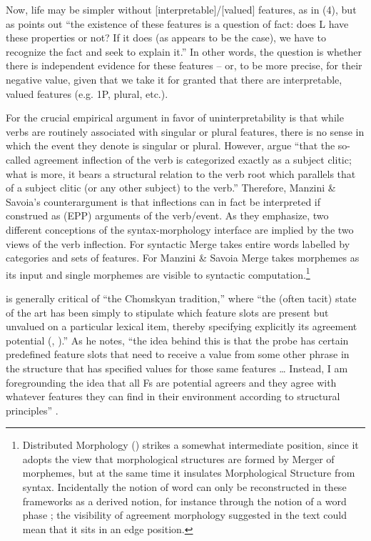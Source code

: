 \documentclass[output=paper]{langsci/langscibook}
\begin{document}
 Now, life may be simpler without [interpretable]/[valued] features, as in (4), but as \citet[4]{Chomsky2001Derivation} points out “the existence of these features is a question of fact: does L have these properties or not? If it does (as appears to be the case), we have to recognize the fact and seek to explain it.” In other words, the question is whether there is independent evidence for these features – or, to be more precise, for their negative value, given that we take it for granted that there are interpretable, valued features (e.g. 1P, plural, etc.).

For \citet{Chomsky1995} the crucial empirical argument in favor of uninterpretability is that while verbs are routinely associated with singular or plural features, there is no sense in which the event they denote is singular or plural. However, \citet[21]{Manzini2007} argue “that the so-called agreement inflection of the verb is categorized exactly as a subject clitic; what is more, it bears a structural relation to the verb root which parallels that of a subject clitic (or any other subject) to the verb.” Therefore, Manzini \& Savoia’s counterargument is that inflections can in fact be interpreted if construed as (EPP) arguments of the verb\slash event. As they emphasize, two different conceptions of the syntax-morphology interface are implied by the two views of the verb inflection. For \citet{Chomsky1995} syntactic Merge takes entire words labelled by categories and sets of features. For Manzini \& Savoia Merge takes morphemes as its input and single morphemes are visible to syntactic computation.\footnote{Distributed Morphology (\citealt{Halle1993}) strikes a somewhat intermediate position, since it adopts the view that morphological structures are formed by Merger of morphemes, but at the same time it insulates Morphological Structure from syntax. Incidentally the notion of word can only be reconstructed in these frameworks as a derived notion, for instance through the notion of a word phase \citep{Marantz2007}; the visibility of agreement morphology suggested in the text could mean that it sits in an edge position.} 

\citet[4]{Baker2008} is generally critical of “the Chomskyan tradition,” where “the (often tacit) state of the art has been simply to stipulate which feature slots are present but unvalued on a particular lexical item, thereby specifying explicitly its agreement potential (\citealt{Chomsky2000}, \citealt{Chomsky2001Derivation}).” As he notes, “the idea behind this is that the probe has certain predefined feature slots that need to receive a value from some other phrase in the structure that has specified values for those same features … Instead, I am foregrounding the idea that all Fs are potential agreers and they agree with whatever features they can find in their environment according to structural principles” \citep[44]{Baker2008}.{}  
\end{document}
